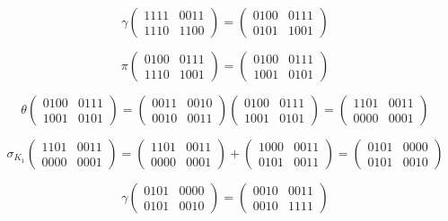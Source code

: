 \documentclass[a4paper]{article}
\begin{document}
$$\gamma \begin{pmatrix} 1111 & 0011 \\ 1110 & 1100 \end{pmatrix} = \begin{pmatrix} 0100 & 0111 \\ 0101 & 1001 \end{pmatrix}$$

$$\pi \begin{pmatrix} 0100 & 0111 \\ 1110 & 1001 \end{pmatrix} = \begin{pmatrix} 0100 & 0111 \\ 1001 & 0101 \end{pmatrix}$$

$$\theta \begin{pmatrix} 0100 & 0111 \\ 1001 & 0101 \end{pmatrix} = \begin{pmatrix} 0011 & 0010 \\ 0010 & 0011 \end{pmatrix}\begin{pmatrix} 0100 & 0111 \\ 1001 & 0101 \end{pmatrix} = \begin{pmatrix} 1101 & 0011 \\ 0000 & 0001 \end{pmatrix}$$

$$\sigma_{K_1} \begin{pmatrix} 1101 & 0011 \\ 0000 & 0001 \end{pmatrix} = \begin{pmatrix} 1101 & 0011 \\ 0000 & 0001 \end{pmatrix} + \begin{pmatrix} 1000 & 0011 \\ 0101 & 0011 \end{pmatrix} = \begin{pmatrix} 0101 & 0000 \\ 0101 & 0010 \end{pmatrix}$$

$$\gamma \begin{pmatrix} 0101 & 0000 \\ 0101 & 0010 \end{pmatrix} = \begin{pmatrix} 0010 & 0011 \\ 0010 & 1111 \end{pmatrix}$$
\end{document}
